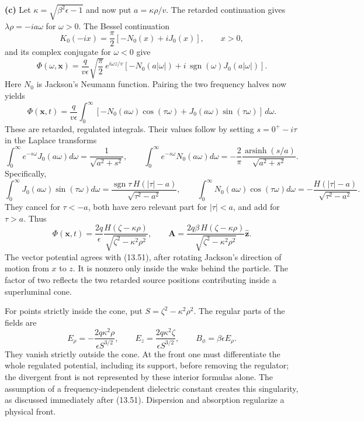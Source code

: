 \textbf{(c)} Let $\kappa=\sqrt{\beta^2\epsilon-1}$ and now put
$a=\kappa\rho/v$. The retarded continuation gives
$\lambda\rho=-ia\omega$ for $\omega>0$. The Bessel continuation
\[
 K_0(-ix)=\frac{\pi}{2}[-N_0(x)+iJ_0(x)],\qquad x>0,
\]
and its complex conjugate for $\omega<0$ give
\[
 \boxed{\Phi(\omega,\mathbf x)=
 \frac{q}{v\epsilon}\sqrt{\frac\pi2}\,e^{i\omega z/v}
 [-N_0(a|\omega|)+i\,\operatorname{sgn}(\omega)J_0(a|\omega|)].}
\]
Here $N_0$ is Jackson's Neumann function. Pairing the two frequency
halves now yields
\[
 \Phi(\mathbf x,t)=\frac{q}{v\epsilon}
 \int_0^\infty[-N_0(a\omega)\cos(\tau\omega)
                    +J_0(a\omega)\sin(\tau\omega)]\,d\omega.
\]
These are retarded, regulated integrals. Their values follow by setting
$s=0^+-i\tau$ in the Laplace transforms
\[
 \int_0^\infty e^{-s\omega}J_0(a\omega)d\omega
   =\frac1{\sqrt{a^2+s^2}},\qquad
 \int_0^\infty e^{-s\omega}N_0(a\omega)d\omega
   =-\frac2\pi\frac{\operatorname{arsinh}(s/a)}
                     {\sqrt{a^2+s^2}}.
\]
Specifically,
\[
 \int_0^\infty J_0(a\omega)\sin(\tau\omega)d\omega
 =\frac{\operatorname{sgn}\tau\,H(|\tau|-a)}
       {\sqrt{\tau^2-a^2}},
 \qquad
 \int_0^\infty N_0(a\omega)\cos(\tau\omega)d\omega
 =-\frac{H(|\tau|-a)}{\sqrt{\tau^2-a^2}}.
\]
They cancel for $\tau<-a$, both have zero relevant part for $|\tau|<a$,
and add for $\tau>a$. Thus
\[
 \boxed{\Phi(\mathbf x,t)=
 \frac{2q}{\epsilon}
 \frac{H(\zeta-\kappa\rho)}{\sqrt{\zeta^2-\kappa^2\rho^2}},
 \qquad
 \mathbf A=\frac{2q\beta\,H(\zeta-\kappa\rho)}
                 {\sqrt{\zeta^2-\kappa^2\rho^2}}\hat{\mathbf z}.}
\]
The vector potential agrees with (13.51), after rotating Jackson's
direction of motion from $x$ to $z$. It is nonzero only inside the
wake behind the particle. The factor of two reflects the two retarded
source positions contributing inside a superluminal cone.

For points strictly inside the cone, put $S=\zeta^2-\kappa^2\rho^2$.
The regular parts of the fields are
\[
 \boxed{E_\rho=-\frac{2q\kappa^2\rho}{\epsilon S^{3/2}},
 \qquad E_z=\frac{2q\kappa^2\zeta}{\epsilon S^{3/2}},
 \qquad B_\phi=\beta\epsilon E_\rho.}
\]
They vanish strictly outside the cone. At the front one must
differentiate the whole regulated potential, including its support,
before removing the regulator; the divergent front is not represented
by these interior formulas alone. The assumption of a frequency-independent
dielectric constant creates this singularity, as discussed immediately
after (13.51). Dispersion and absorption regularize a physical front.





